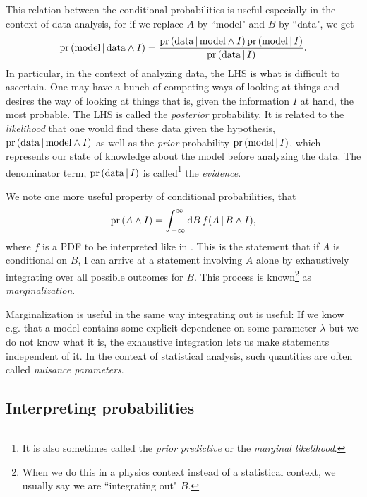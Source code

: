 This relation between the conditional probabilities is useful especially in the
context of data analysis, for if we replace $A$ by ``model" and $B$ by ``data",
we get 
\begin{equation}
\operatorname{pr}\left(\text{model}\,|\, \text{data}\land I\right)
=\frac{\operatorname{pr}\left(\text{data}\,|\, \text{model}\land I\right)\operatorname{pr}\left(\text{model}\,|\, I\right)}{\operatorname{pr}\left(\text{data}\,|\,
I\right)}.
\end{equation}
In particular, in the context of analyzing data, the LHS is what is difficult to
ascertain. One may have a bunch of competing ways of looking at things and
desires the way of looking at things that is, given the information $I$ at hand,
the most probable. The LHS is called the {\it posterior}
probability. It is related to the {\it likelihood} that one
would find these data given the hypothesis, $\operatorname{pr}\left(\text{data}\,|\,
\text{model}\land I\right)$ as well as the {\it prior}
probability $\operatorname{pr}\left(\text{model}\,|\, I\right)$, which represents our state of
knowledge about the model before analyzing the data. The denominator term,
$\operatorname{pr}\left(\text{data}\,|\, I\right)$ is called\footnote{It is also sometimes called
the {\it prior predictive} or the 
{\it marginal likelihood}.} 
the {\it evidence}. 

We note one more useful property of conditional probabilities, that
\begin{equation}
\operatorname{pr}\left(A\land I\right)=\int_{-\infty}^\infty \dd{B} f(A\,|\, B\land I),
\end{equation}
where $f$ is a PDF to be interpreted like in .
This is the statement that if $A$ is conditional on $B$, I can arrive at a
statement involving $A$ alone by exhaustively integrating over all possible
outcomes for $B$. This process is known\footnote{When we do this in a physics
context instead of a statistical context, we usually say we are ``integrating
out" $B$.} as {\it marginalization}.

Marginalization is useful in the same way integrating out is useful: If we know
e.g. that a model contains some explicit dependence on some parameter $\lambda$
but we do not know what it is, the exhaustive integration lets us make statements
independent of it. In the context of statistical analysis, such quantities are
often called {\it nuisance parameters}.

\subsection{Interpreting probabilities}

